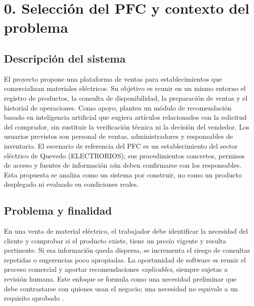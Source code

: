 \section*{0. Selecci\'on del PFC y contexto del problema}
\subsection*{Descripci\'on del sistema}
El proyecto propone una plataforma de ventas para establecimientos que comercializan materiales el\'ectricos. Su objetivo es reunir en un mismo entorno el registro de productos, la consulta de disponibilidad, la preparaci\'on de ventas y el historial de operaciones. Como apoyo, plantea un m\'odulo de recomendaci\'on basado en inteligencia artificial que sugiera art\'iculos relacionados con la solicitud del comprador, sin sustituir la verificaci\'on t\'ecnica ni la decisi\'on del vendedor. Los usuarios previstos son personal de ventas, administradores y responsables de inventario. El escenario de referencia del PFC es un establecimiento del sector el\'ectrico de Quevedo (ELECTRORIOS); sus procedimientos concretos, permisos de acceso y fuentes de informaci\'on a\'un deben confirmarse con los responsables. Esta propuesta se analiza como un sistema por construir, no como un producto desplegado ni evaluado en condiciones reales.

\subsection*{Problema y finalidad}
En una venta de material el\'ectrico, el trabajador debe identificar la necesidad del cliente y comprobar si el producto existe, tiene un precio vigente y resulta pertinente. Si esa informaci\'on queda dispersa, se incrementa el riesgo de consultas repetidas o sugerencias poco apropiadas. La oportunidad de software es reunir el proceso comercial y aportar recomendaciones \emph{explicables}, siempre sujetas a revisi\'on humana. Este enfoque se formula como una necesidad preliminar que debe contrastarse con quienes usan el negocio; una necesidad no equivale a un requisito aprobado \cite{iso29148,pohl2025}.

